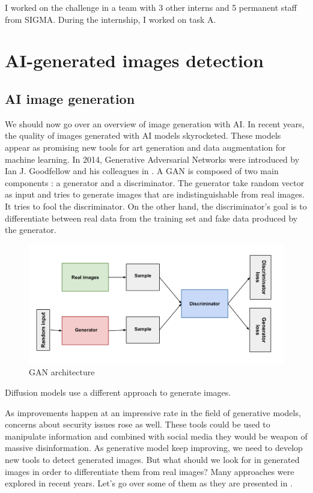 \documentclass[12pt,a4paper]{article}
\begin{document}
I worked on the challenge in a team with 3 other interns and 5 permanent staff from SIGMA. During the internship, I worked on task A.


\section{AI-generated images detection}
\subsection{AI image generation}
We should now go over an overview of image generation with AI. In recent years, the quality of images generated with AI models skyrocketed. These models appear as promising new tools for art generation and data augmentation for machine learning. In 2014, Generative Adversarial Networks were introduced by Ian J. Goodfellow and his colleagues in \autocite*{goodfellowGenerativeAdversarialNetworks2014}. A GAN is composed of two main components : a generator and a discriminator. The generator take random vector as input and tries to generate images that are indistinguishable from real images. It tries to fool the discriminator. On the other hand, the discriminator's goal is to differentiate between real data from the training set and fake data produced by the generator.
\begin{figure}[H]
    \centering
    \includegraphics[width=\textwidth]{img/GAN.png}
    \caption{GAN architecture}
\end{figure}

Diffusion models use a different approach to generate images.


As improvements happen at an impressive rate in the field of generative models, concerns about security issues rose as well. These tools could be used to manipulate information and combined with social media they would be weapon of massive disinformation. As generative model keep improving, we need to develop new tools to detect generated images. But what should we look for in generated images in order to differentiate them from real images? Many approaches were explored in recent years. Let's go over some of them as they are presented in \autocite*{tariangSyntheticImageVerification2024}.
\end{document}
